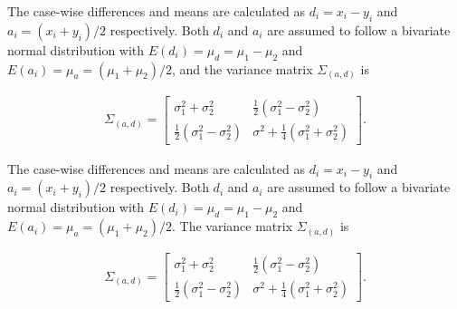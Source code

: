 \documentclass[12pt, a4paper]{report}
\theoremstyle{plain}
\theoremstyle{definition}
\theoremstyle{remark}
\begin{document}
	
	
	
	The case-wise differences and means are calculated as $d_{i} =
	x_{i}-y_{i}$ and $a_{i} = (x_{i}+y_{i})/2$  respectively. Both
	$d_{i}$ and $a_{i}$ are assumed to follow a bivariate normal
	distribution with $E(d_{i})= \mu_{d} = \mu_{1} - \mu_{2}$ and
	$E(a_{i})= \mu_{a} = (\mu_{1} + \mu_{2})/2$, and the variance matrix
	$\Sigma_{(a,d)}$ is
	
	\begin{eqnarray}
	\Sigma_{(a,d)}= \left[\begin{matrix}
	\sigma^{2}_{1}+\sigma^{2}_{2}&\frac{1}{2}(\sigma^{2}_{1}-\sigma^{2}_{2})\\
	\frac{1}{2}(\sigma^{2}_{1}-\sigma^{2}_{2})&\sigma^{2}+
	\frac{1}{4}(\sigma^{2}_{1}+\sigma^{2}_{2})
	\end{matrix} \right].
	\end{eqnarray}
	
\bigskip


	
	The case-wise differences and means are calculated as $d_{i} =
	x_{i}-y_{i}$ and $a_{i} = (x_{i}+y_{i})/2$  respectively. Both
	$d_{i}$ and $a_{i}$ are assumed to follow a bivariate normal
	distribution with $E(d_{i})= \mu_{d} = \mu_{1} - \mu_{2}$ and
	$E(a_{i})= \mu_{a} = (\mu_{1} + \mu_{2})/2$. The variance matrix
	$\Sigma_{(a,d)}$ is
	
	\begin{eqnarray}
	\Sigma_{(a,d)}= \left[\begin{matrix}
	\sigma^{2}_{1}+\sigma^{2}_{2}&\frac{1}{2}(\sigma^{2}_{1}-\sigma^{2}_{2})\\
	\frac{1}{2}(\sigma^{2}_{1}-\sigma^{2}_{2})&\sigma^{2}+
	\frac{1}{4}(\sigma^{2}_{1}+\sigma^{2}_{2})
	\end{matrix} \right].
	\end{eqnarray}
	
\end{document}
